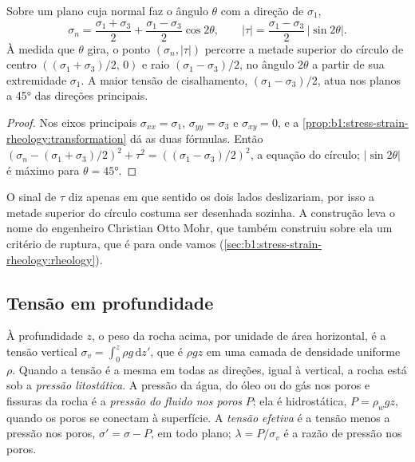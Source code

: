 \begin{proposition}\label{prop:b1:stress-strain-rheology:mohr}
Sobre um plano cuja normal faz o ângulo $\theta$ com a direção de $\sigma_1$,
\[
  \sigma_n = \frac{\sigma_1+\sigma_3}{2} + \frac{\sigma_1-\sigma_3}{2}\cos2\theta,
  \qquad
  |\tau| = \frac{\sigma_1-\sigma_3}{2}\,|\sin2\theta| .
\]
À medida que $\theta$ gira, o ponto $(\sigma_n, |\tau|)$ percorre a metade superior do círculo de centro $((\sigma_1+\sigma_3)/2,\, 0)$ e raio $(\sigma_1-\sigma_3)/2$, no ângulo $2\theta$ a partir de sua extremidade $\sigma_1$. A maior tensão de cisalhamento, $(\sigma_1-\sigma_3)/2$, atua nos planos a \ang{45} das direções principais.
\end{proposition}

\begin{proof}
Nos eixos principais $\sigma_{xx} = \sigma_1$, $\sigma_{yy} = \sigma_3$ e $\sigma_{xy} = 0$, e a
\cref{prop:b1:stress-strain-rheology:transformation} dá as duas fórmulas. Então
$(\sigma_n - (\sigma_1+\sigma_3)/2)^2 + \tau^2 = ((\sigma_1-\sigma_3)/2)^2$, a equação do círculo; $|\sin2\theta|$ é máximo para $\theta = \ang{45}$.
\end{proof}

O sinal de $\tau$ diz apenas em que sentido os dois lados deslizariam, por isso a metade superior do círculo costuma ser desenhada sozinha. A construção leva o nome do engenheiro Christian Otto Mohr, que também construiu sobre ela um critério de ruptura, que é para onde vamos
(\cref{sec:b1:stress-strain-rheology:rheology}).

\subsection*{Tensão em profundidade}

\begin{definition}\label{def:b1:stress-strain-rheology:lithostatic}
À profundidade $z$, o peso da rocha acima, por unidade de área horizontal, é a tensão vertical $\sigma_v = \int_0^z\rho g\,\mathrm dz'$, que é $\rho g z$ em uma camada de densidade uniforme $\rho$. Quando a tensão é a mesma em todas as direções, igual à vertical, a rocha está sob a \emph{pressão litostática}. A pressão da água, do óleo ou do gás nos poros e fissuras da rocha é a \emph{pressão do fluido nos poros} $P$; ela é hidrostática, $P = \rho_w g z$, quando os poros se conectam à superfície. A \emph{tensão efetiva} é a tensão menos a pressão nos poros, $\sigma' = \sigma - P$, em todo plano; $\lambda = P/\sigma_v$ é a razão de pressão nos poros.
\end{definition}

